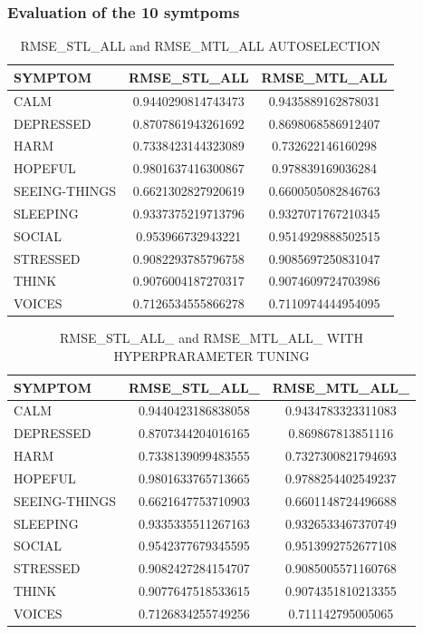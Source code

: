 \subsubsection{Evaluation of the 10 symtpoms}


\begin{table}[H]
\centering
\caption { RMSE\_STL\_ALL and RMSE\_MTL\_ALL AUTOSELECTION}
\label{table:rmse_all_auto}
\begin{tabular}{|l|c|c|}
\hline
\textbf{SYMPTOM} & \textbf{RMSE\_STL\_ALL} & \textbf{RMSE\_MTL\_ALL} \\ \hline
CALM & 0.9440290814743473 & 0.9435889162878031 \\ \hline
DEPRESSED & 0.8707861943261692 & 0.8698068586912407 \\ \hline
HARM & 0.7338423144323089 & 0.732622146160298 \\ \hline
HOPEFUL & 0.9801637416300867 & 0.978839169036284 \\ \hline
SEEING-THINGS & 0.6621302827920619 & 0.6600505082846763 \\ \hline
SLEEPING & 0.9337375219713796 & 0.9327071767210345 \\ \hline
SOCIAL & 0.953966732943221 & 0.9514929888502515 \\ \hline
STRESSED & 0.9082293785796758 & 0.9085697250831047 \\ \hline
THINK & 0.9076004187270317 & 0.9074609724703986 \\ \hline
VOICES & 0.7126534555866278 & 0.7110974444954095 \\ \hline
\end{tabular}
\end{table}

\begin{table}[H]
\centering
\caption{ RMSE\_STL\_ALL\_ and RMSE\_MTL\_ALL\_ WITH HYPERPRARAMETER TUNING}
\label{table:rmse_all_hyper}
\begin{tabular}{|l|c|c|}
\hline
\textbf{SYMPTOM} & \textbf{RMSE\_STL\_ALL\_} & \textbf{RMSE\_MTL\_ALL\_} \\ \hline
CALM & 0.9440423186838058 & 0.9434783323311083 \\ \hline
DEPRESSED & 0.8707344204016165 & 0.869867813851116 \\ \hline
HARM & 0.7338139099483555 & 0.7327300821794693 \\ \hline
HOPEFUL & 0.9801633765713665 & 0.9788254402549237 \\ \hline
SEEING-THINGS & 0.6621647753710903 & 0.6601148724496688 \\ \hline
SLEEPING & 0.9335335511267163 & 0.9326533467370749 \\ \hline
SOCIAL & 0.9542377679345595 & 0.9513992752677108 \\ \hline
STRESSED & 0.9082427284154707 & 0.9085005571160768 \\ \hline
THINK & 0.9077647518533615 & 0.9074351810213355 \\ \hline
VOICES & 0.7126834255749256 & 0.711142795005065 \\ \hline
\end{tabular}
\end{table}







